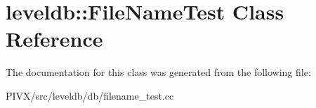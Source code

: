 \hypertarget{classleveldb_1_1_file_name_test}{}\section{leveldb\+:\+:File\+Name\+Test Class Reference}
\label{classleveldb_1_1_file_name_test}


The documentation for this class was generated from the following file\+:\begin{DoxyCompactItemize}
\item 
P\+I\+V\+X/src/leveldb/db/filename\+\_\+test.\+cc\end{DoxyCompactItemize}
